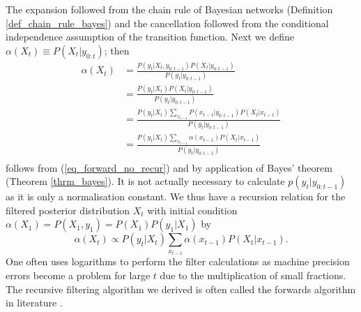 The expansion followed from the chain rule of Bayesian networks (Definition \ref{def_chain_rule_bayes}) and the cancellation followed from the conditional independence assumption of the transition function. Next we define $\alpha(X_t) \equiv P(X_t | y_{0:t})$; then
\begin{equation}
\begin{aligned}
\alpha(X_t) &= \frac{P(y_t|X_t, y_{0:t-1})P(X_t|y_{0:t-1})}{P(y_t|y_{0:t-1})} \\
& = \frac{P(y_t|X_t)P(X_t|y_{0:t-1})}{P(y_t|y_{0:t-1})} \\
& = \frac{P(y_t|X_t) \sum_{x_{t-1}} P(x_{t-1}|y_{0:t-1})P(X_t|x_{t-1})}{P(y_t|y_{0:t-1})} \\
& = \frac{P(y_t|X_t) \sum_{x_{t-1}} \alpha(x_{t-1})P(X_t|x_{t-1})}{P(y_t|y_{0:t-1})} \\
\end{aligned}
\label{eq_forward_recur}
\end{equation}
follows from (\ref{eq_forward_no_recur}) and by application of Bayes' theorem (Theorem \ref{thrm_bayes}). It is not actually necessary to calculate $p(y_t|y_{0:t-1})$ as it is only a normalisation constant. We thus have a recursion relation for the filtered posterior distribution $X_t$ with initial condition $\alpha(X_1) = P(X_1, y_1) = P(X_1)P(y_1|X_1)$ by
\begin{equation}
\alpha(X_t) \propto P(y_t|X_t) \sum_{x_{t-1}} \alpha(x_{t-1})P(X_t|x_{t-1}).
\label{eq_forward_approx}
\end{equation}
One often uses logarithms to perform the filter calculations as machine precision errors become a problem for large $t$ due to the multiplication of small fractions. The recursive filtering algorithm we derived is often called the forwards algorithm in literature \cite{barber}.

